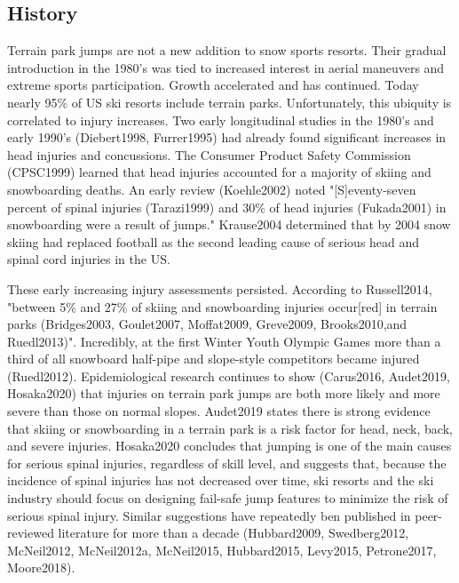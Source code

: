 \documentclass{article}
\begin{document}
\subsection{History}
%
Terrain park jumps are not a new addition to snow sports resorts. Their gradual 
introduction in the 1980's was tied to increased interest in aerial maneuvers 
and extreme sports participation. Growth accelerated and has continued.
Today nearly 95\% of US ski resorts include terrain parks. Unfortunately,
this ubiquity is correlated to injury increases.  Two early longitudinal studies  
in the 1980's and early 1990's (Diebert1998, Furrer1995) had already found significant 
increases in head injuries and concussions. The Consumer Product Safety Commission 
(CPSC1999) learned that head injuries accounted for a majority of skiing and 
snowboarding deaths. An early review (Koehle2002) noted "[S]eventy-seven percent 
of spinal injuries (Tarazi1999) and 30\% of head injuries (Fukada2001) in 
snowboarding were a result of jumps." Krause2004 %
determined that by 2004 snow skiing had replaced football as the second leading 
cause of serious head and spinal cord injuries in the US. 

These early increasing injury assessments persisted. According to Russell2014, "between 
5\% and 27\% of skiing and snowboarding injuries occur[red] in terrain parks 
(Bridges2003, Goulet2007,  Moffat2009, Greve2009, Brooks2010,and Ruedl2013)". 
Incredibly, at the first Winter Youth Olympic Games more than a third of all 
snowboard half-pipe and slope-style competitors became injured (Ruedl2012). 
Epidemiological research continues to show (Carus2016, Audet2019, Hosaka2020) 
that injuries on terrain park jumps are both more likely and more severe than 
those on normal slopes.  Audet2019 states  there is strong evidence that skiing 
or snowboarding in a terrain park is a risk factor for head, neck, back, and 
severe injuries. Hosaka2020 concludes that jumping is one of the main causes 
for serious spinal injuries, regardless of skill level, and suggests that, 
because the incidence of spinal injuries has not decreased over time, ski resorts 
and the ski industry should focus on designing fail-safe jump features to minimize 
the risk of serious spinal injury.  Similar suggestions have repeatedly ben published 
in peer-reviewed literature for more than a decade (Hubbard2009, Swedberg2012, McNeil2012, 
McNeil2012a, McNeil2015, Hubbard2015, Levy2015, Petrone2017, Moore2018).  
\end{document}
